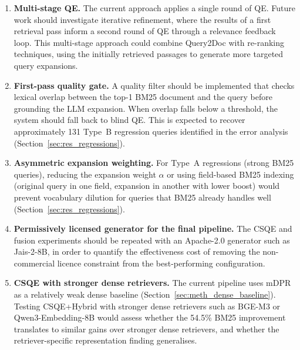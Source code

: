 \begin{enumerate}[label=\roman*.]
    \item \textbf{Multi-stage QE.} The current approach applies a single round of QE. Future work should investigate iterative refinement, where the results of a first retrieval pass inform a second round of QE through a relevance feedback loop. This multi-stage approach could combine Query2Doc with re-ranking techniques, using the initially retrieved passages to generate more targeted query expansions.

    \item \textbf{First-pass quality gate.} A quality filter should be implemented that checks lexical overlap between the top-1 BM25 document and the query before grounding the LLM expansion. When overlap falls below a threshold, the system should fall back to blind QE. This is expected to recover approximately 131 Type~B regression queries identified in the error analysis (Section~\ref{sec:res_regressions}).

    \item \textbf{Asymmetric expansion weighting.} For Type~A regressions (strong BM25 queries), reducing the expansion weight $\alpha$ or using field-based BM25 indexing (original query in one field, expansion in another with lower boost) would prevent vocabulary dilution for queries that BM25 already handles well (Section~\ref{sec:res_regressions}).

    \item \textbf{Permissively licensed generator for the final pipeline.} The CSQE and fusion experiments should be repeated with an Apache-2.0 generator such as Jais-2-8B, in order to quantify the effectiveness cost of removing the non-commercial licence constraint from the best-performing configuration.

    \item \textbf{CSQE with stronger dense retrievers.} The current pipeline uses mDPR as a relatively weak dense baseline (Section~\ref{sec:meth_dense_baseline}). Testing CSQE+Hybrid with stronger dense retrievers such as BGE-M3 or Qwen3-Embedding-8B would assess whether the 54.5\% BM25 improvement translates to similar gains over stronger dense retrievers, and whether the retriever-specific representation finding generalises.
\end{enumerate}
